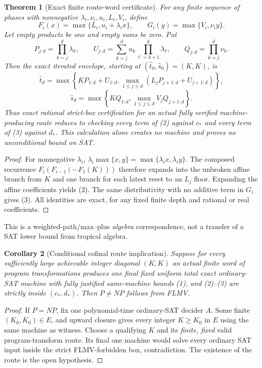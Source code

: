 \documentclass[11pt]{article}
\newtheorem{theorem}{Theorem}
\newtheorem{corollary}[theorem]{Corollary}
\begin{document}
\begin{theorem}[Exact finite route-word certificate]
For any \emph{finite} sequence of phases with nonnegative
$\lambda_i,\nu_i,u_i,L_i,V_i$, define
\[
 F_i(x)=\max\{L_i,u_i+\lambda_i x\},\qquad
 G_i(y)=\max\{V_i,\nu_i y\}.
\]
Let empty products be one and empty sums be zero. Put
\[
 P_{j:d}=\prod_{k=j}^{d}\lambda_k,\qquad
 U_{j:d}=\sum_{k=j}^{d}u_k\prod_{\ell=k+1}^{d}\lambda_\ell,
 \qquad Q_{j:d}=\prod_{k=j}^{d}\nu_k.
\]
Then the \emph{exact iterated envelope}, starting at
$(\widehat t_0,\widehat s_0)=(K,K)$, is
\[
 \boxed{\widehat t_d=
 \max\left\{K P_{1:d}+U_{1:d},
 \max_{1\le j\le d}\left(
 L_jP_{j+1:d}+U_{j+1:d}\right)\right\},}
 \tag{2}
\]
\[
 \boxed{\widehat s_d=
 \max\left\{KQ_{1:d},
 \max_{1\le j\le d}V_jQ_{j+1:d}\right\}.}
 \tag{3}
\]
Thus exact rational strict-box certification for an actual
fully verified machine-producing route reduces to checking
\emph{every} term of (2) against $c_*$ and \emph{every} term
of (3) against $d_*$. This calculation alone creates no
machine and proves no unconditional bound on SAT.
\end{theorem}
\begin{proof}
For nonnegative $\lambda_i$,
$\lambda_i\max\{x,y\}=\max\{\lambda_i x,\lambda_i y\}$.
The composed recurrence
$F_i(F_{i-1}(\cdots F_1(K)))$ therefore expands into
the unbroken affine branch from $K$ and one branch for each
latest reset to an $L_j$ floor. Expanding the affine
coefficients yields (2).
The same distributivity with no additive term in $G_i$
gives (3). All identities are exact, for any fixed finite
depth and rational or real coefficients.
\end{proof}
This is a weighted-path/max--plus \emph{algebra} correspondence,
not a transfer of a SAT lower bound from tropical algebra.

\begin{corollary}[Conditional cofinal route implication]
Suppose for every sufficiently large achievable integer diagonal
$(K,K)$ an \emph{actual} finite word of program transformations
produces \emph{one final fixed uniform total exact ordinary-SAT machine}
with fully justified same-machine bounds (1), and (2)--(3) are
strictly inside $(c_*,d_*)$. Then $P\ne NP$ follows from FLMV.
\end{corollary}
\begin{proof}
If $P=NP$, fix one polynomial-time ordinary-SAT decider $A$.
Some finite $(K_0,K_0)\in E$, and upward closure gives every
integer $K\ge K_0$ in $E$ using the same machine as witness.
Choose a qualifying $K$ and its \emph{finite, fixed} valid
program-transform route. Its final one machine would solve
every ordinary SAT input inside the strict FLMV-forbidden box,
contradiction. The existence of the route is the open hypothesis.
\end{proof}
\end{document}
